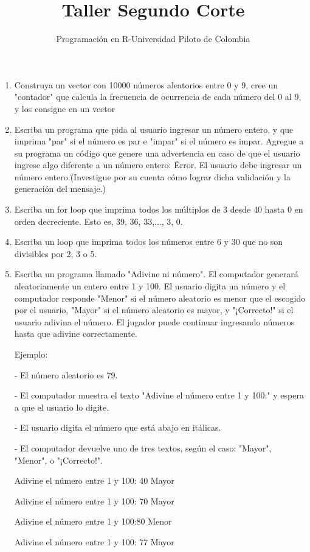 \documentclass[11pt]{article} %
\title{Taller Segundo Corte}
\author{Programación en R-Universidad Piloto de Colombia}
\date{}
\begin{document}
\maketitle
\begin{enumerate}
\item Construya un vector con 10000 números aleatorios entre 0 y 9, cree un "contador" que calcula la frecuencia de ocurrencia de cada número del 0 al 9, y los consigne en un vector
\item Escriba un programa que pida al usuario ingresar un número entero, y que imprima "par" si el número es par e "impar" si el número es impar. Agregue a su programa un código que genere una advertencia en caso de que el usuario ingrese algo diferente a un número entero: \"Error. El usuario debe ingresar un número entero.\" (Investigue por su cuenta cómo lograr dicha validación y la generación del mensaje.)\par
\item Escriba un for loop que imprima todos los múltiplos de 3 desde 40 hasta 0 en orden decreciente. Esto es, 39, 36, 33,..., 3, 0.
\item Escriba un loop que imprima todos los números entre 6 y 30 que no son divisibles por 2, 3 o 5.
\item Escriba un programa llamado "Adivine ni número". El computador generará aleatoriamente un entero entre 1 y 100. El usuario digita un número y el computador responde "Menor" si el número aleatorio es menor que el escogido por el usuario, "Mayor" si el número aleatorio es mayor, y "¡Correcto!" si el usuario adivina el número. El jugador puede continuar ingresando números hasta que adivine correctamente.\par
Ejemplo:\par
- El número aleatorio es 79.\par
- El computador muestra el texto "Adivine el número entre 1 y 100:" y espera a que el usuario lo digite.\par
- El usuario digita el número que está abajo en itálicas.\par
- El computador devuelve uno de tres textos, según el caso: "Mayor", "Menor", o "¡Correcto!".\par
Adivine el número entre 1 y 100: 40 Mayor\par
Adivine el número entre 1 y 100: 70 Mayor\par
Adivine el número entre 1 y 100:80 Menor\par
Adivine el número entre 1 y 100: 77 Mayor\par

\end{enumerate}
\end{document}
